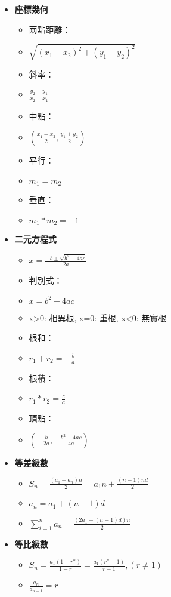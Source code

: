 \begin{itemize}
   \item \textbf{座標幾何}
  \begin{itemize}
    \item 兩點距離：
    \item $\sqrt{(x_1-x_2)^2+(y_1-y_2)^2}$
    \item 斜率：
    \item $\frac{y_2-y_1}{x_2-x_1}$
    \item 中點：
    \item $(\frac{x_1+x_2}{2}, \frac{y_1+y_2}{2})$
    \item 平行：
    \item $m_1 = m_2$
    \item 垂直：
    \item $m_1 * m_2 = -1$
  \end{itemize}

  \item \textbf{二元方程式}
  \begin{itemize}
    \item $x = \frac{-b \pm \sqrt{b^2-4ac}}{2a}$
    \item 判別式：
    \item $x = b^2-4ac$
    \item x>0: 相異根, x=0: 重根, x<0: 無實根
    \item 根和：
    \item $r_1+r_2 = -\frac{b}{a}$
    \item 根積：
    \item $r_1*r_2 = \frac{c}{a}$
    \item 頂點：
    \item $(-\frac{b}{2a}, -\frac{b^2-4ac}{4a})$
  \end{itemize}

\item \textbf{等差級數}
  \begin{itemize}
    \item $S_n = \frac{(a_1 + a_n)n}{2} = a_1n + \frac{(n-1)nd}{2}$
    \item $a_n = a_1 + (n-1)d$
    \item $\sum \limits_{i=1}^n a_n = \frac{(2a_1+(n-1)d)n}{2}$
  \end{itemize}
  
  \item \textbf{等比級數}
  \begin{itemize}
    \item $S_n = \frac{a_1(1-r^n)}{1-r} = \frac{a_1(r^n-1)}{r-1}, (r \neq 1)$
    \item $\frac{a_n}{a_{n-1}} = r$
  \end{itemize}


\end{itemize}
